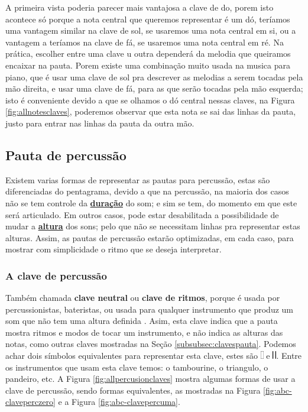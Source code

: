 A primeira vista poderia parecer mais vantajosa a clave de do, 
porem isto acontece só porque a nota central que queremos representar é um dó,
teríamos uma vantagem similar na clave de sol, se usaremos uma nota central em si,
ou a vantagem a teríamos na clave de fá, se usaremos uma nota central em ré. 
Na prática, escolher entre
uma clave u outra dependerá da melodia que queiramos encaixar na pauta.
Porem existe uma combinação muito usada na musica para piano, 
que é usar uma clave de sol pra descrever as melodias a serem tocadas pela mão direita,
e usar uma clave de fá, para as que serão tocadas pela mão esquerda; 
isto é conveniente devido a que se olhamos o dó central nessas claves, 
na Figura \ref{fig:allnotesclaves}, 
poderemos observar que esta nota se sai das linhas da pauta, 
justo para entrar nas linhas da pauta da outra mão.

\subsection{Pauta de percussão}

Existem varias formas de representar as pautas para percussão, 
estas são diferenciadas do pentagrama, devido a que na percussão, 
na maioria dos casos não se tem controle da \hyperref[sec:pos:Duracion]{\textbf{duração}} do som;
e sim se tem, do momento em que este será articulado. Em outros casos,
pode estar desabilitada a possibilidade de mudar a \hyperref[sec:pos:Altura]{\textbf{altura}} dos sons;
pelo que não se necessitam linhas pra representar estas alturas.
Assim, as pautas de percussão estarão optimizadas, em cada caso, 
para mostrar com simplicidade o ritmo que se deseja interpretar.

\subsubsection{A clave de percussão}
Também chamada \textbf{clave neutral} ou \textbf{clave de ritmos}, 
porque é usada por percussionistas, bateristas, 
ou usada para qualquer instrumento que produz um som que não tem uma altura definida \cite[pp. 51]{harnum2009basic}.
Asim, esta clave indica que a pauta mostra ritmos e modos de tocar um instrumento, 
e não indica as alturas das notas, 
como outras claves mostradas na Seção \ref{subsubsec:clavespauta}.
Podemos achar dois símbolos equivalentes para representar esta clave, 
estes são \includegraphics[height=10pt]{chapters/cap-musica-basica/P1-clef.eps}
e \includegraphics[height=10pt]{chapters/cap-musica-basica/P2-clef.eps}.
Entre os instrumentos que usam esta clave temos:
o tambourine, o triangulo, o pandeiro, etc.
A Figura \ref{fig:allpercusionclaves} mostra algumas formas de usar a clave de percussão,
sendo formas equivalentes, as mostradas na Figura \ref{fig:abc-claveperczero} e a Figura \ref{fig:abc-clavepercuma}.

